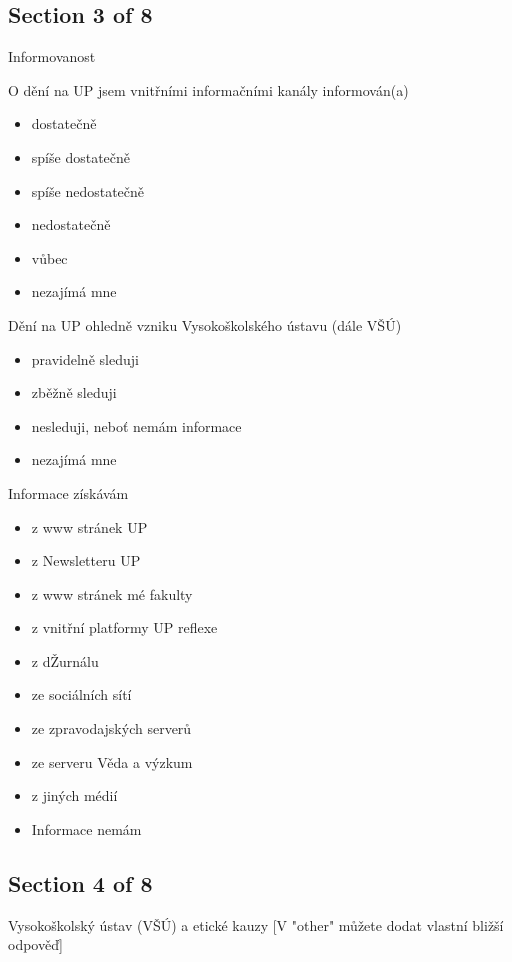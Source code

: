 \subsection{Section 3 of 8}
Informovanost

\bigskip
O dění na UP jsem vnitřními informačními kanály informován(a)
\begin{itemize}
      \item dostatečně
      \item spíše dostatečně
      \item spíše nedostatečně
      \item nedostatečně
      \item vůbec
      \item nezajímá mne
\end{itemize}

Dění na UP ohledně vzniku Vysokoškolského ústavu (dále VŠÚ)
\begin{itemize}
      \item pravidelně sleduji
      \item zběžně sleduji
      \item nesleduji, neboť nemám informace
      \item nezajímá mne
\end{itemize}

Informace získávám
\begin{itemize}
      \item z www stránek UP
      \item z Newsletteru UP
      \item z www stránek mé fakulty
      \item z vnitřní platformy UP reflexe
      \item z dŽurnálu
      \item ze sociálních sítí
      \item ze zpravodajských serverů
      \item ze serveru Věda a výzkum
      \item z jiných médií
      \item Informace nemám
\end{itemize}

\subsection{Section 4 of 8}

Vysokoškolský ústav (VŠÚ) a etické kauzy
[V "other" můžete dodat vlastní bližší odpověď]

